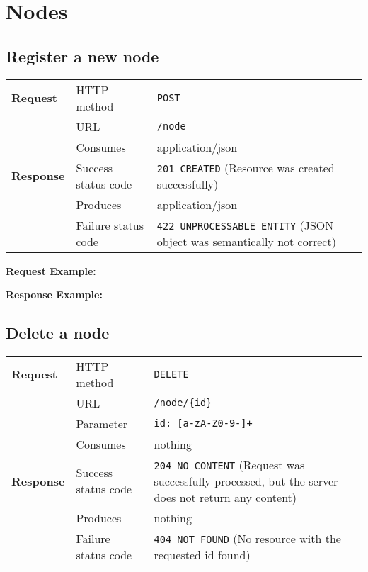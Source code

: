 \section{Nodes} %

\subsection{Register a new node} %

\begin{center}
	\begin{tabularx}{\textwidth}{llX} 
	    \toprule
					\textbf{Request}        &   HTTP method             &   \texttt{POST}			\tabularnewline
		                        			&   URL                     &   \texttt{/node}           	\tabularnewline
                                  &   Consumes                &   application/json					      	\tabularnewline \midrule                       
          \textbf{Response}       &   Success status code     &   \texttt{201 CREATED} (Resource was created successfully) 	\tabularnewline
                                  &   Produces                &   application/json								\tabularnewline
                                  &   Failure status code     &   \texttt{422 UNPROCESSABLE ENTITY} (JSON object was semantically not correct)	\tabularnewline
           \bottomrule
	\end{tabularx}
\end{center}
\pagebreak[3] 	
		\textbf{Request Example:}
		
\pagebreak[3]
		\textbf{Response Example:}
		


\subsection{Delete a node} %

\begin{center}
	\begin{tabularx}{\textwidth}{llX} 
	    \toprule
					\textbf{Request}        &   HTTP method             &   \texttt{DELETE}			\tabularnewline
		                        			&   URL                     &   \texttt{/node/\{id\}}           	\tabularnewline
									& Parameter & \texttt{id: [a-zA-Z0-9-]+} \tabularnewline
                                  &   Consumes                &   nothing					      	\tabularnewline \midrule                       
          \textbf{Response}       &   Success status code     &   \texttt{204 NO CONTENT} (Request was successfully processed, but the server does not return any content) 	\tabularnewline
                                  &   Produces                &   nothing								\tabularnewline
                                  &   Failure status code     &   \texttt{404 NOT FOUND} (No resource with the requested id found)	\tabularnewline
           \bottomrule
	\end{tabularx}
\end{center}
\pagebreak[3] 	
\pagebreak[3]




